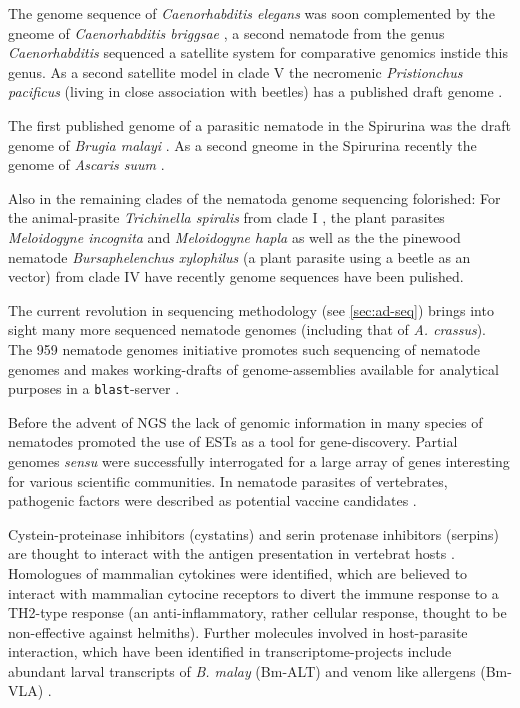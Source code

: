 The genome sequence of \textit{Caenorhabditis elegans} was soon
complemented by the gneome of \textit{Caenorhabditis briggsae}
\cite{stein_genome_2003}, a second nematode from the genus
\textit{Caenorhabditis} sequenced a satellite system for comparative
genomics instide this genus. As a second satellite model in clade V
the necromenic \textit{Pristionchus pacificus} (living in close
association with beetles) has a published draft genome
\cite{pmid18806794}.

The first published genome of a parasitic nematode in the Spirurina
was the draft genome of \textit{Brugia malayi}
\cite{ghedin_draft_2007}. As a second gneome in the Spirurina recently
the genome of \textit{Ascaris suum} \cite{pmid22031327}.

Also in the remaining clades of the nematoda genome sequencing
folorished: For the animal-prasite \textit{Trichinella spiralis} from
clade I \cite{pmid21336279}, the plant parasites \textit{Meloidogyne
  incognita} \cite{pmid18660804} and \textit{Meloidogyne hapla}
\cite{pmid18809916} as well as the the pinewood nematode
\textit{Bursaphelenchus xylophilus} \cite{pmid21909270} (a plant
parasite using a beetle as an vector) from clade IV have recently
genome sequences have been pulished.

The current revolution in sequencing methodology (see
\ref{sec:ad-seq}) brings into sight many more sequenced nematode
genomes (including that of \textit{A. crassus}). The 959 nematode
genomes initiative promotes such sequencing of nematode genomes and
makes working-drafts of genome-assemblies available for analytical
purposes in a \texttt{blast}-server \cite{pmid22058131} .

Before the advent of NGS the lack of genomic information in many
species of nematodes promoted the use of ESTs as a tool for
gene-discovery. Partial genomes \textit{sensu}
\cite{parkinson_partigene--constructing_2004} were successfully
interrogated for a large array of genes interesting for various
scientific communities. In nematode parasites of vertebrates,
pathogenic factors were described as potential vaccine candidates
\cite{pmid11406138}.

Cystein-proteinase inhibitors (cystatins) and serin protenase
inhibitors (serpins) are thought to interact with the antigen
presentation in vertebrat hosts \cite{pmid11406138}. Homologues of
mammalian cytokines were identified, which are believed to interact
with mammalian cytocine receptors to divert the immune response to a
TH2-type response \cite{maizels_helminth_2004} (an anti-inflammatory,
rather cellular response, thought to be non-effective against
helmiths). Further molecules involved in host-parasite interaction,
which have been identified in transcriptome-projects include abundant
larval transcripts of \textit{B. malay} (Bm-ALT)
\cite{gomez-escobar_abundant_2002} and venom like allergens (Bm-VLA)
\cite{pmid11704277}.

